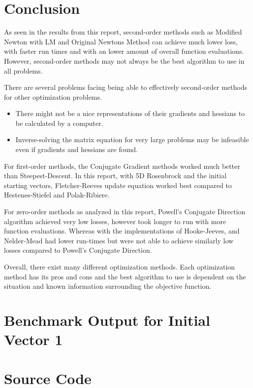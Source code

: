 \documentclass{article}
\begin{document}
    \section{Conclusion}

    As seen in the results from this report, second-order methods such as Modified Newton with LM and Original Newtons Method can achieve much lower loss, with faster run times and with an lower amount of overall function evaluations. However, second-order methods may not always be the best algorithm to use in all problems. 
    
    There are several problems facing being able to effectively second-order methods for other optimization problems.
    \begin{itemize}
        \item There might not be a nice representations of their gradients and hessians to be calculated by a computer. 
        \item Inverse-solving the matrix equation for very large problems may be infeasible even if gradients and hessians are found.
    \end{itemize}

    For first-order methods, the Conjugate Gradient methods worked much better than Steepest-Descent. In this report, with 5D Rosenbrock and the initial starting vectors, Fletcher-Reeves update equation worked best compared to Hestenes-Stiefel and Polak-Ribiere.

    For zero-order methods as analyzed in this report, Powell's Conjugate Direction algorithm achieved very low losses, however took longer to run with more function evaluations. Whereas with the implementations of Hooke-Jeeves, and Nelder-Mead had lower run-times but were not able to achieve similarly low losses compared to Powell's Conjugate Direction.

    Overall, there exist many different optimization methods. Each optimization method has its pros and cons and the best algorithm to use is dependent on the situation and known information surrounding the objective function.

    \newpage
    \appendix

    \section{Benchmark Output for Initial Vector 1}

    \section{Source Code}
\end{document}
